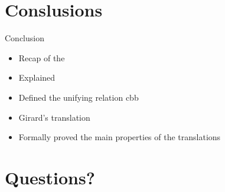 \documentclass{beamer}
\theoremstyle{definition}
\begin{document}
  \section{Conslusions}
  
  \begin{frame}{Conclusion}
    \begin{itemize}
      \item[\textbullet] Recap of the \lc \pause
      \item[\textbullet] Explained \alert{\lab} \pause
      \item[\textbullet] Defined the unifying relation \alert{\textsf{cbb}} \pause
      \item[\textbullet] \alert{Girard's} translation \pause
      \item[\textbullet] Formally proved the main properties of the translations    
    \end{itemize}
  \end{frame}

  \section{Questions?}


\end{document}
